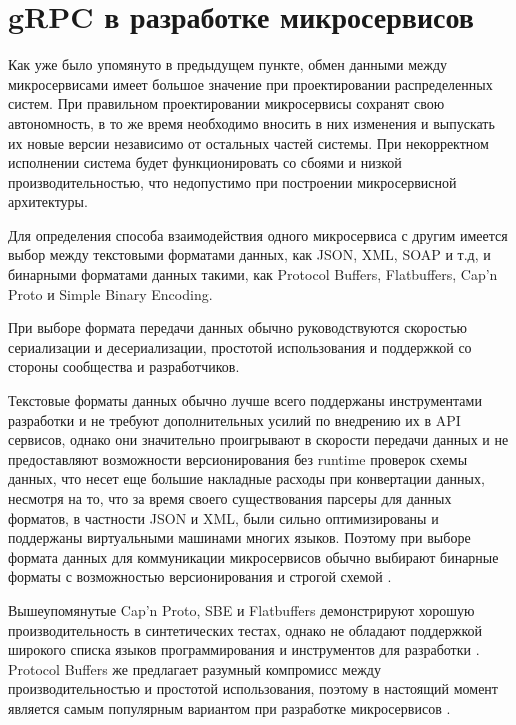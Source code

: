 \section{gRPC в разработке микросервисов}

Как уже было упомянуто в предыдущем пункте, обмен данными между микросервисами имеет большое значение при проектировании распределенных систем. При правильном проектировании микросервисы сохранят свою
автономность, в то же время необходимо вносить в них изменения и выпускать их новые версии независимо от остальных частей системы. При некорректном исполнении система будет функционировать со сбоями и низкой производительностью, что недопустимо при построении микросервисной архитектуры.

Для определения способа взаимодействия одного микросервиса с другим имеется
выбор между текстовыми форматами данных, как JSON, XML, SOAP и т.д, и бинарными форматами данных такими, как Protocol Buffers, Flatbuffers, 
Cap'n Proto и Simple Binary Encoding. 

При выборе формата передачи данных обычно руководствуются скоростью сериализации и десериализации, простотой использования и поддержкой со стороны сообщества и разработчиков.

Текстовые форматы данных обычно лучше всего поддержаны инструментами разработки и не требуют дополнительных усилий по внедрению их в API сервисов, однако они значительно проигрывают в скорости передачи данных и не предоставляют возможности версионирования без runtime проверок схемы данных, что несет еще большие накладные расходы при конвертации данных, несмотря на то, что за время своего существования парсеры для данных форматов, в частности JSON и XML, были сильно оптимизированы и поддержаны виртуальными машинами многих языков. Поэтому при выборе формата данных для коммуникации микросервисов обычно выбирают бинарные форматы с возможностью версионирования и строгой схемой \cite{Bolanowski_2022}.

Вышеупомянутые Cap'n Proto, SBE и Flatbuffers демонстрируют хорошую производительность в синтетических тестах, однако не обладают поддержкой широкого списка языков программирования и инструментов для разработки \cite{comp}. Protocol Buffers же предлагает разумный компромисс между производительностью и простотой использования, поэтому в настоящий момент является самым популярным вариантом при разработке микросервисов \cite{protobuf}.

